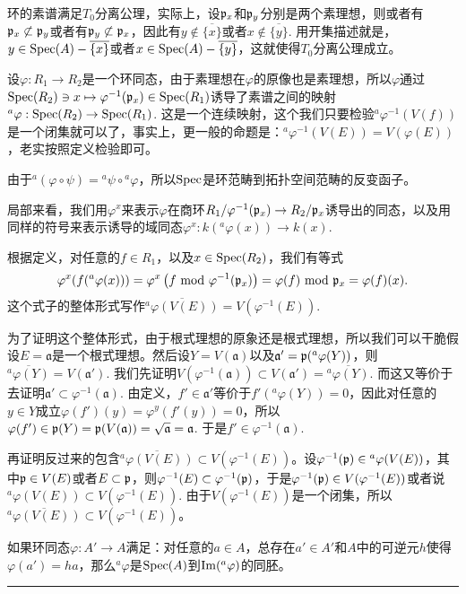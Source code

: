 \para 环的素谱满足$T_0$分离公理，实际上，设$\mathfrak{p}_x$和$\mathfrak{p}_y$分别是两个素理想，则或者有$\mathfrak{p}_x\not\subset \mathfrak{p}_y$或者有$\mathfrak{p}_y\not\subset \mathfrak{p}_x$，因此有$y\not\in \overline{\{x\}}$或者$x\not\in \overline{\{y\}}$. 用开集描述就是，$y\in \operatorname{Spec}(A)-\overline{\{x\}}$或者$x\in \operatorname{Spec}(A)-\overline{\{y\}}$，这就使得$T_0$分离公理成立。

\para 设$\varphi:R_1\to R_2$是一个环同态，由于素理想在$\varphi$的原像也是素理想，所以$\varphi$通过$\operatorname{Spec}(R_2)\ni x\mapsto \varphi^{-1}(\mathfrak{p}_x)\in \operatorname{Spec}(R_1)$诱导了素谱之间的映射$^a\varphi:\operatorname{Spec}(R_2)\to \operatorname{Spec}(R_1)$. 这是一个连续映射，这个我们只要检验$^a\varphi^{-1}(V(f))$是一个闭集就可以了，事实上，更一般的命题是：$^a\varphi^{-1}(V(E))=V(\varphi(E))$，老实按照定义检验即可。

由于$^a(\varphi\circ \psi)={^a\psi}\circ{^a\varphi}$，所以$\operatorname{Spec}$是环范畴到拓扑空间范畴的反变函子。

\para 局部来看，我们用$\varphi^x$来表示$\varphi$在商环$R_1/\varphi^{-1}(\mathfrak{p}_x)\to R_2/\mathfrak{p}_x$诱导出的同态，以及用同样的符号来表示诱导的域同态$\varphi^x:k({^a}\varphi(x))\to k(x)$.

根据定义，对任意的$f\in R_1$，以及$x\in \operatorname{Spec}(R_2)$，我们有等式
\[
	\varphi^x(f({^a}\varphi(x)))=\varphi^x\left(f \text{ mod } \varphi^{-1}(\mathfrak{p}_x)\right)=\varphi(f)\text{ mod } \mathfrak{p}_x=\varphi(f)(x).
\]
这个式子的整体形式写作$\overline{{^a}\varphi(V(E))}=V(\varphi^{-1}(E))$. 

为了证明这个整体形式，由于根式理想的原象还是根式理想，所以我们可以干脆假设$E=\mathfrak{a}$是一个根式理想。然后设$Y=V(\mathfrak{a})$以及$\mathfrak{a}'=\mathfrak{p}({^a}\varphi(Y))$，则$\overline{{^a}\varphi(Y)}=V(\mathfrak{a}')$. 我们先证明$V(\varphi^{-1}(\mathfrak{a}))\subset V(\mathfrak{a}')=\overline{{^a}\varphi(Y)}$. 而这又等价于去证明$\mathfrak{a}'\subset \varphi^{-1}(\mathfrak{a})$. 由定义，$f'\in \mathfrak{a}'$等价于$f'({^a\varphi}(Y))=0$，因此对任意的$y\in Y$成立$\varphi(f')(y)=\varphi^y(f'(y))=0$，所以$\varphi(f')\in \mathfrak{p}(Y)=\mathfrak{p}(V(\mathfrak{a}))=\sqrt{\mathfrak{a}}=\mathfrak{a}$. 于是$f'\in \varphi^{-1}(\mathfrak{a})$.

再证明反过来的包含$\overline{{^a}\varphi(V(E))}\subset V(\varphi^{-1}(E))$。设$\varphi^{-1}(\mathfrak{p})\in {^a}\varphi(V(E))$，其中$\mathfrak{p}\in V(E)$或者$E\subset \mathfrak{p}$，则$\varphi^{-1}(E)\subset \varphi^{-1}(\mathfrak{p})$，于是$\varphi^{-1}(\mathfrak{p})\in V(\varphi^{-1}(E))$或者说${^a}\varphi(V(E))\subset V(\varphi^{-1}(E))$. 由于$V(\varphi^{-1}(E))$是一个闭集，所以$\overline{{^a}\varphi(V(E))}\subset V(\varphi^{-1}(E))$。

\pro 如果环同态$\varphi:A'\to A$满足：对任意的$a\in A$，总存在$a'\in A'$和$A$中的可逆元$h$使得$\varphi(a')=ha$，那么$^a\varphi$是$\operatorname{Spec}(A)$到$\operatorname{Im} (^a\varphi)$的同胚。\rule{2mm}{2mm}

